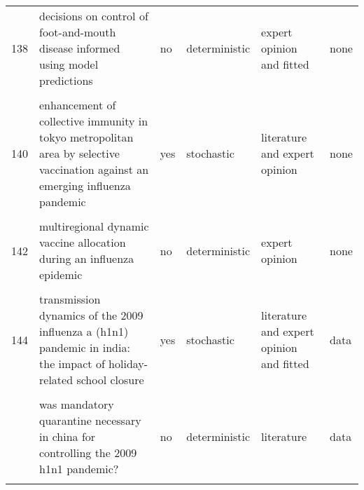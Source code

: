 \documentclass[
]{article}
\begin{document}
\begin{landscape}
\begin{longtable}{l>{\raggedright\arraybackslash}p{3cm}l>{\raggedright\arraybackslash}p{3cm}ll}
138 & decisions on control of foot-and-mouth disease informed using model predictions & no & deterministic & expert opinion and fitted & none\\
\cellcolor{gray!6}{139} & \cellcolor{gray!6}{dengue in cape verde: vector control and vaccination} & \cellcolor{gray!6}{no} & \cellcolor{gray!6}{deterministic} & \cellcolor{gray!6}{literature and expert opinion} & \cellcolor{gray!6}{none}\\
140 & enhancement of collective immunity in tokyo metropolitan area by selective vaccination against an emerging influenza pandemic & yes & stochastic & literature and expert opinion & none\\
\addlinespace
\cellcolor{gray!6}{141} & \cellcolor{gray!6}{estimated impact of aggressive empirical antiviral treatment in containing an outbreak of pandemic influenza h1n1 in an isolated first nations community} & \cellcolor{gray!6}{no} & \cellcolor{gray!6}{deterministic} & \cellcolor{gray!6}{fitted} & \cellcolor{gray!6}{none}\\
142 & multiregional dynamic vaccine allocation during an influenza epidemic & no & deterministic & expert opinion & none\\
\cellcolor{gray!6}{143} & \cellcolor{gray!6}{policies to reduce influenza in the workplace: impact assessments using an agent-based model} & \cellcolor{gray!6}{yes} & \cellcolor{gray!6}{stochastic} & \cellcolor{gray!6}{literature and expert opinion} & \cellcolor{gray!6}{none}\\
144 & transmission dynamics of the 2009 influenza a (h1n1) pandemic in india: the impact of holiday-related school closure & yes & stochastic & literature and expert opinion and fitted & data\\
\cellcolor{gray!6}{145} & \cellcolor{gray!6}{vaccination against foot-and-mouth disease: do initial conditions affect its benefit?} & \cellcolor{gray!6}{yes} & \cellcolor{gray!6}{deterministic} & \cellcolor{gray!6}{literature} & \cellcolor{gray!6}{none}\\
\addlinespace
146 & was mandatory quarantine necessary in china for controlling the 2009 h1n1 pandemic? & no & deterministic & literature & data\\
\cellcolor{gray!6}{147} & \cellcolor{gray!6}{a contact-network-based simulation model for evaluating interventions under 'what-if' scenarios in epidemic} & \cellcolor{gray!6}{yes} & \cellcolor{gray!6}{deterministic} & \cellcolor{gray!6}{literature and expert opinion} & \cellcolor{gray!6}{none}\\

\end{longtable}
\end{landscape}
\end{document}
